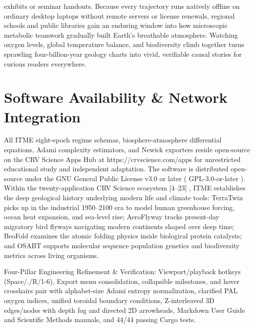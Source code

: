 \documentclass[10pt,letterpaper]{article}
\begin{document}
exhibits or seminar handouts. Because every trajectory runs natively offline on ordinary desktop laptops without remote servers or license renewals, regional schools and public libraries gain an enduring window into how microscopic metabolic teamwork gradually built Earth's breathable atmosphere. Watching oxygen levels, global temperature balance, and biodiversity climb together turns sprawling four-billion-year geology charts into vivid, verifiable causal stories for curious readers everywhere.

\section{Software Availability \& Network Integration}
All ITME eight-epoch regime schemas, biosphere-atmosphere differential equations, Adami complexity estimators, and Newick exporters reside open-source on the CRV Science Apps Hub at https://crvscience.com/apps for unrestricted educational study and independent adaptation. The software is distributed open-source under the GNU General Public License v3.0 or later ( GPL-3.0-or-later ). Within the twenty-application CRV Science ecosystem [4--23] , ITME establishes the deep geological history underlying modern life and climate tools: TerraTwin picks up in the industrial 1950--2100 era to model human greenhouse forcing, ocean heat expansion, and sea-level rise; AeroFlyway tracks present-day migratory bird flyways navigating modern continents shaped over deep time; BeoFold examines the atomic folding physics inside biological protein catalysts; and OSABT supports molecular sequence population genetics and biodiversity metrics across living organisms.

Four-Pillar Engineering Refinement \& Verification: Viewport/playback hotkeys (Space/./R/1-6), Export menu consolidation, collapsible milestones, and hover crosshairs pair with alphabet-size Adami entropy normalization, clarified PAL oxygen indices, unified toroidal boundary conditions, Z-interleaved 3D edges/nodes with depth fog and directed 2D arrowheads, Markdown User Guide and Scientific Methods manuals, and 44/44 passing Cargo tests.
\end{document}
